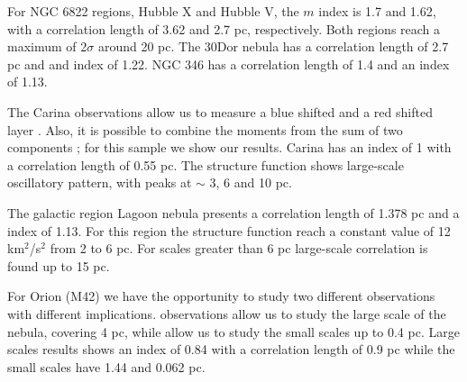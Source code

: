 \documentclass[fleqn,usenatbib, useAMS, a4paper]{mnras}
\begin{document}
For NGC 6822 regions, Hubble X and Hubble V, the $m$ index is 1.7 and 1.62, with a correlation length of 3.62 and 2.7 pc, respectively.
Both regions reach a maximum of 2$\sigma$ around 20 pc.
The 30Dor nebula \citep{Castro:2018a} has a correlation length of 2.7 pc and and index of 1.22.
NGC 346 has a correlation length of 1.4 and an index of 1.13.

The Carina observations allow us to measure a blue shifted and a red shifted layer \citet{Damiani:2016a}.
Also, it is possible to combine the moments from the sum of two components \citep{2008RMxAA..44..181G}; for this sample we show our results.
Carina has an index of 1 with a correlation length of 0.55 pc.
The structure function shows large-scale oscillatory pattern, with peaks at \(\sim\) 3, 6 and 10 pc.

The galactic region Lagoon nebula \citep{Damiani:2017b} presents a correlation length of 1.378 pc and a index of 1.13.
For this region the structure function reach a constant value of 12 km$^{2}$/s$^{2}$ from 2 to 6 pc.
For scales greater than 6 pc large-scale correlation is found up to 15 pc.

For Orion (M42) we have the opportunity to study two different observations with different implications. \citet{1987A&A...176..347H} observations allow us to study the large scale of the nebula, covering 4 pc, while \cite{arthur2016turbulence} allow us to study the small scales up to 0.4 pc. Large scales results shows an index of 0.84 with a correlation length of 0.9 pc while the small scales have 1.44 and 0.062 pc.
  
\end{document}
